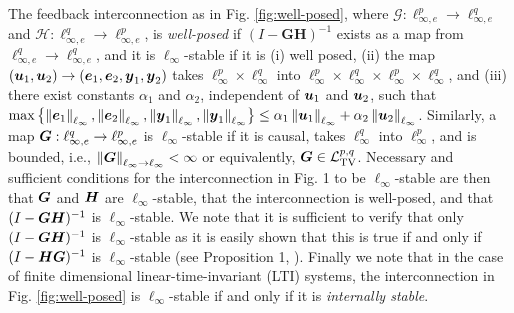 The feedback interconnection as in Fig. \ref{fig:well-posed}, where $\mathcal{G}: \ell_{\infty,e}^p \to \ell_{\infty,e}^q$ and $\mathcal{H}: \ell_{\infty,e}^q \to \ell_{\infty,e}^p$, is \emph{well-posed} if $(I-\mathbf{GH})^{-1}$ exists as a map from $\ell_{\infty,e}^q \to \ell_{\infty,e}^q$, and it is $\ell_\infty$-stable if it is (i) well posed, (ii) the map $(\boldsymbol{u}_1,\boldsymbol{u}_2) \to (\boldsymbol{e}_1,\boldsymbol{e}_2, \boldsymbol{y}_1, \boldsymbol{y}_2)$ takes $ \ell_{\infty}^p \times \ell_{\infty}^q$ into $\ell_{\infty}^p \times \ell_{\infty}^q \times \ell_{\infty}^p \times \ell_{\infty}^q$, and (iii) there exist constants $\alpha_1$ and $\alpha_2$, independent of $\boldsymbol{u}_1$ and $\boldsymbol{u}_2$, such that $\max\left\{\left\|\boldsymbol{e}_1\right\|_{\ell_\infty},\left\|\boldsymbol{e}_2\right\|_{\ell_\infty},\left\|\boldsymbol{y}_1\right\|_{\ell_\infty},\left\|\boldsymbol{y}_1\right\|_{\ell_\infty}\right\} \leq \alpha_1\left\|\boldsymbol{u}_1\right\|_{\ell_\infty}+\alpha_2\left\|\boldsymbol{u}_2\right\|_{\ell_\infty}$.  Similarly, a map $\boldsymbol{G}:\ell_{\infty,e}^q \to \ell_{\infty,e}^p$ is $\ell_\infty$-stable if it is causal, takes $\ell_\infty^q$ into $\ell_\infty^p$, and is bounded, i.e., $\left\|\boldsymbol{G}\right\|_{\ell_\infty\to\ell_\infty} < \infty$ or equivalently, $\boldsymbol{G} \in \mathcal{L}_{\mathrm{TV}}^{p,q}$.  Necessary and sufficient conditions for the interconnection in Fig. 1 to be $\ell_\infty$-stable are then that $\boldsymbol{G}$ and $\boldsymbol{H}$ are $\ell_\infty$-stable, that the interconnection is well-posed, and that $(I-\boldsymbol{G} \boldsymbol{H})^{-1}$ is $\ell_\infty$-stable.  We note that it is sufficient to verify that only $(I-\boldsymbol{G} \boldsymbol{H})^{-1}$ is $\ell_\infty$-stable as it is easily shown that this is true if and only if $(I-\boldsymbol{H} \boldsymbol{G})^{-1}$ is $\ell_\infty$-stable (see Proposition 1, \cite{khammash1990stability}).  Finally we note that in the case of finite dimensional linear-time-invariant (LTI) systems, the interconnection in Fig. \ref{fig:well-posed} is $\ell_\infty$-stable if and only if it is \emph{internally stable}.